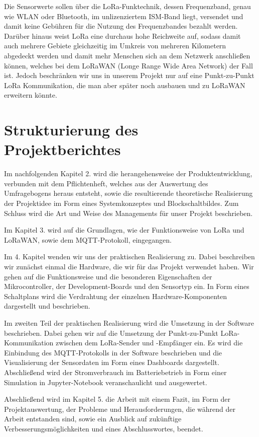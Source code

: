 Die Sensorwerte sollen über die LoRa-Funktechnik, dessen Frequenzband, genau wie WLAN oder Bluetooth, im unlizenziertem ISM-Band liegt, versendet und damit keine Gebühren für die Nutzung des Frequenzbandes bezahlt werden. Darüber hinaus weist LoRa eine durchaus hohe Reichweite auf, sodass damit auch mehrere Gebiete gleichzeitig im Umkreis von mehreren Kilometern abgedeckt werden und damit mehr Menschen sich an dem Netzwerk anschließen können, welches bei dem LoRaWAN (Longe Range Wide Area Network) der Fall ist. Jedoch beschränken wir uns in unserem Projekt nur auf eine Punkt-zu-Punkt LoRa Kommunikation, die man aber später noch ausbauen und zu LoRaWAN erweitern könnte.  

\section{Strukturierung des Projektberichtes} \label{Strukturierung des Projektberichtes}

Im nachfolgenden Kapitel 2. wird die herangehensweise der Produktentwicklung, verbunden mit dem Pflichtenheft, welches aus der Auswertung des Umfragebogens heraus entsteht, sowie die resultierende theoretische Realisierung der Projektidee im Form eines Systemkonzeptes und Blockschaltbildes. Zum Schluss wird die Art und Weise des Managements für unser Projekt beschrieben. 

Im Kapitel 3. wird auf die Grundlagen, wie der Funktionsweise von LoRa und LoRaWAN, sowie dem MQTT-Protokoll, eingegangen.  

Im 4. Kapitel wenden wir uns der praktischen Realisierung zu. Dabei beschreiben wir zunächst einmal die Hardware, die wir für das Projekt verwendet haben. Wir gehen auf die Funktionsweise und die besonderen Eigenschaften der Mikrocontroller, der Development-Boards und den Sensortyp ein. In Form eines Schaltplans wird die Verdrahtung der einzelnen Hardware-Komponenten dargestellt und beschrieben.

Im zweiten Teil der praktischen Realisierung wird die Umsetzung in der Software beschrieben. Dabei gehen wir auf die Umsetzung der Punkt-zu-Punkt LoRa-Kommunikation zwischen dem LoRa-Sender und -Empfänger ein. Es wird die Einbindung des MQTT-Protokolls in der Software beschrieben und die Visualisierung der Sensordaten im Form eines Dashboards dargestellt. Abschließend wird der Stromverbrauch im Batteriebetrieb in Form einer Simulation in Jupyter-Notebook veranschaulicht und ausgewertet. 

Abschließend wird im Kapitel 5. die Arbeit mit einem Fazit, im Form der Projektauswertung, der Probleme und Herausforderungen, die während der Arbeit entstanden sind, sowie ein Ausblick auf zukünftige Verbesserungsmöglichkeiten und eines Abschlusswortes, beendet. 
